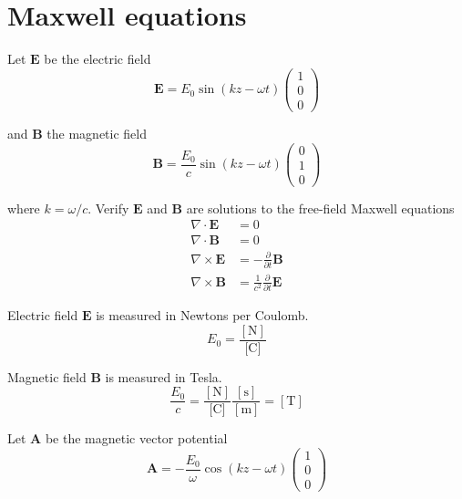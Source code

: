 

\section*{Maxwell equations}

Let $\mathbf E$ be the electric field
\begin{equation*}
\mathbf E=E_0\sin(kz-\omega t)
\begin{pmatrix}
1\\0\\0
\end{pmatrix}
\end{equation*}

and $\mathbf B$ the magnetic field
\begin{equation*}
\mathbf B=\frac{E_0}{c}\sin(kz-\omega t)
\begin{pmatrix}
0\\1\\0
\end{pmatrix}
\end{equation*}

where $k=\omega/c$.
Verify $\mathbf E$ and $\mathbf B$ are solutions to the free-field Maxwell equations
\begin{align*}
\nabla\cdot\mathbf E&=0
\\
\nabla\cdot\mathbf B&=0
\\
\nabla\times\mathbf E&=-\frac{\partial}{\partial t}{\mathbf B}
\\[1ex]
\nabla\times\mathbf B&=\frac{1}{c^2}\frac{\partial}{\partial t}{\mathbf E}
\end{align*}

Electric field $\mathbf E$ is measured in Newtons per Coulomb.
\begin{equation*}
E_0=\frac{[\text{N}]}{\text{[C]}}
\end{equation*}

Magnetic field $\mathbf B$ is measured in Tesla.
\begin{equation*}
\frac{E_0}{c}=\frac{[\text{N}]}{\text{[C]}}\frac{[\text{s}]}{[\text{m}]}=[\text{T}]
\end{equation*}

Let $\mathbf A$ be the magnetic vector potential
\begin{equation*}
\mathbf A=-\frac{E_0}{\omega}\cos(kz-\omega t)
\begin{pmatrix}
1\\0\\0
\end{pmatrix}
\end{equation*}

